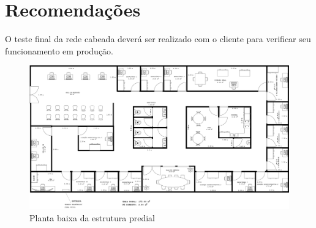 \documentclass[	DIV=calc,%
							paper=a4,%
							fontsize=12pt,%
							onecolumn]{scrartcl}	 					%
\begin{document}
\section{Recomendações}

O teste final da rede cabeada deverá ser realizado com o cliente para verificar seu funcionamento em produção. 

 

%
%  

\begin{figure}
	\includegraphics[height=\textwidth,angle=-90,scale=0.8]{planta2d}
	\caption{Planta baixa da estrutura predial}
	\label{planta2d}
\end{figure}
\end{document}
